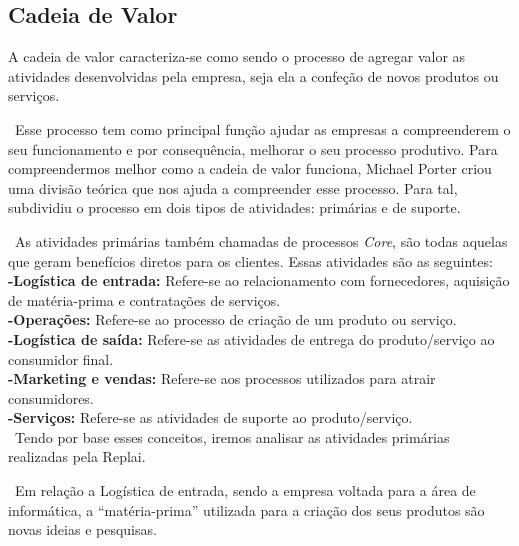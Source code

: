 \subsection{Cadeia de Valor}
A cadeia de valor caracteriza-se como sendo o processo de agregar valor as atividades desenvolvidas pela empresa, seja ela a confeção de novos produtos ou serviços. 

\ Esse processo tem como principal função ajudar as empresas a compreenderem o seu funcionamento e por consequência, melhorar o seu processo produtivo.
Para compreendermos melhor como a cadeia de valor funciona, Michael Porter criou uma divisão teórica que nos ajuda a compreender esse processo. Para tal, subdividiu o processo em dois tipos de atividades: primárias e de suporte\cite{CadeiaDeValor1}.

\ As atividades primárias também chamadas de processos \textit{Core}, são todas aquelas que geram benefícios diretos para os clientes. Essas atividades são as seguintes:\\

\textbf{-Logística de entrada:}  Refere-se ao relacionamento com fornecedores, aquisição de matéria-prima e contratações de serviços.\\

\textbf{-Operações:} Refere-se ao processo de criação de um produto ou serviço.\\

\textbf{-Logística de saída:} Refere-se as atividades de entrega do produto/serviço ao consumidor final.\\

\textbf{-Marketing e vendas:} Refere-se aos processos utilizados para atrair consumidores. \\

\textbf{-Serviços:} Refere-se as atividades de suporte ao produto/serviço.\\

\ Tendo por base esses conceitos, iremos analisar as atividades primárias realizadas pela Replai. 

\ Em relação a Logística de entrada, sendo a empresa voltada para a área de informática, a “matéria-prima” utilizada para a criação dos seus produtos são novas ideias e pesquisas. 

